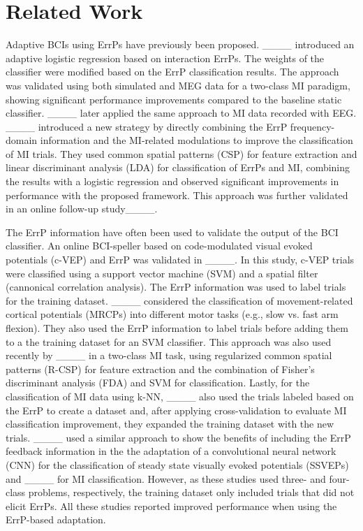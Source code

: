 \section{Related Work}
\label{sec:related_work}
    Adaptive BCIs using ErrPs have previously been proposed.
    ____ introduced an adaptive logistic regression based on interaction ErrPs. The weights of the classifier were modified based on the ErrP classification results. The approach was validated using both simulated and MEG data for a two-class MI paradigm, showing significant performance improvements compared to the baseline static classifier. ____ later applied the same approach to MI data recorded with EEG. 
    ____ introduced a new strategy by directly combining the ErrP frequency-domain information and the MI-related modulations to improve the classification of MI trials. They used common spatial patterns (CSP) for feature extraction and linear discriminant analysis (LDA) for classification of ErrPs and MI, combining the results with a logistic regression and observed significant improvements in performance with the proposed framework. This approach was further validated in an online follow-up study____. 
    
    The ErrP information have often been used to validate the output of the BCI classifier. 
    An online BCI-speller based on code-modulated visual evoked potentials (c-VEP) and ErrP was validated in ____. In this study, c-VEP trials were classified using a support vector machine (SVM) and a spatial filter (cannonical correlation analysis). The ErrP information was used to label trials for the training dataset.
    ____ considered the classification of movement-related cortical potentials (MRCPs) into different motor tasks (e.g., slow vs. fast arm flexion). They also used the ErrP information to label trials before adding them to a the training dataset for an SVM classifier.
    This approach was also used recently by ____ in a two-class MI task, using regularized common spatial patterns (R-CSP) for feature extraction and the combination of Fisher's discriminant analysis (FDA) and SVM for classification. Lastly, for the classification of MI data using k-NN, ____ also used the trials labeled based on the ErrP to create a dataset and, after applying cross-validation to evaluate MI classification improvement, they expanded the training dataset with the new trials. 
    ____ used a similar approach to show the benefits of including the ErrP feedback information in the the adaptation of a convolutional neural network (CNN) for the classification of steady state visually evoked potentials (SSVEPs) and ____ for MI classification. However, as these studies used three- and four-class problems, respectively, the training dataset only included trials that did not elicit ErrPs. 
    All these studies reported improved performance when using the ErrP-based adaptation.